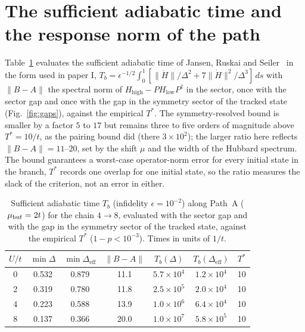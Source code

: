 \documentclass[a4paper,11pt,noarxiv]{quantumarticle}
\newcommand{\Hlow}{H_{\mathrm{low}}}
\newcommand{\Hhigh}{H_{\mathrm{high}}}
\newcommand{\Deff}{\Delta_{\mathrm{eff}}}
\begin{document}
\section{The sufficient adiabatic time and the response norm of the path}
\label{sm:bound}
Table~\ref{tab:bound} evaluates the sufficient adiabatic time of Jansen,
Ruskai and Seiler~\cite{Jansen2007} in the form used in paper I,
$T_b=\epsilon^{-1/2}\int_0^1[\|\ddot H\|/\Delta^2+7\|\dot H\|^2/\Delta^3]\,ds$
with $\|B-A\|$ the spectral norm of $\Hhigh-P\Hlow P^\dagger$ in the sector,
once with the sector gap and once with the gap in the symmetry sector of the
tracked state (Fig.~\ref{fig:gaps}), against the empirical $T^*$.  The
symmetry-resolved bound is smaller by a factor $5$ to $17$ but remains three
to five orders of magnitude above $T^*=10/t$, as the pairing bound did
(there $3\times10^2$); the larger ratio here reflects $\|B-A\|=11$--$20$,
set by the shift $\mu$ and the width of the Hubbard spectrum.  The bound
guarantees a worst-case operator-norm error for every initial state in the
branch, $T^*$ records one overlap for one initial state, so the ratio
measures the slack of the criterion, not an error in either.

\begin{table}[t]
  \caption{Sufficient adiabatic time $T_b$ (infidelity $\epsilon=10^{-2}$)
  along Path~A ($\mu_{\rm buf}=2t$) for the chain $4\to8$, evaluated with the
  sector gap and with the gap in the symmetry sector of the tracked state,
  against the empirical $T^*$ ($1-p<10^{-3}$).  Times in units of $1/t$.}
  \label{tab:bound}
  \centering\scriptsize
  \begin{tabular}{ccccccc}
  \toprule
  $U/t$ & $\min\Delta$ & $\min\Deff$ & $\|B-A\|$ & $T_b(\Delta)$ & $T_b(\Deff)$ & $T^*$\\
  \midrule
  0 & 0.532 & 0.879 & 11.1 & $5.7\times10^{4}$ & $1.2\times10^{4}$ & 10\\
  2 & 0.319 & 0.780 & 11.8 & $2.5\times10^{5}$ & $2.0\times10^{4}$ & 10\\
  4 & 0.223 & 0.588 & 13.9 & $1.0\times10^{6}$ & $6.4\times10^{4}$ & 10\\
  8 & 0.137 & 0.366 & 20.0 & $1.0\times10^{7}$ & $5.8\times10^{5}$ & 10\\
  \bottomrule
  \end{tabular}
\end{table}
\end{document}

